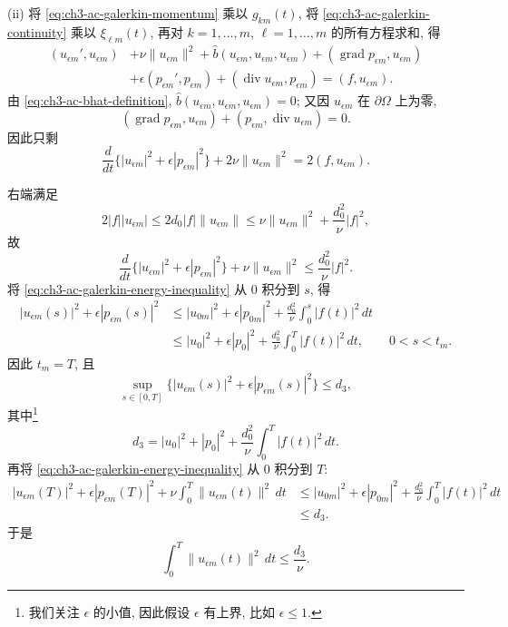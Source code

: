 \begin{Proof}
(ii) 将 \eqref{eq:ch3-ac-galerkin-momentum} 乘以 $g_{km}(t)$, 将 \eqref{eq:ch3-ac-galerkin-continuity} 乘以 $\xi_{\ell m}(t)$, 再对 $k=1,\ldots,m$, $\ell=1,\ldots,m$ 的所有方程求和, 得
\[
\begin{aligned}
(u_{\epsilon m}',u_{\epsilon m})
&+\nu\lVert u_{\epsilon m}\rVert^2
+\widehat b(u_{\epsilon m},u_{\epsilon m},u_{\epsilon m})
+(\operatorname{grad}p_{\epsilon m},u_{\epsilon m})\\
&+\epsilon(p_{\epsilon m}',p_{\epsilon m})
+(\operatorname{div}u_{\epsilon m},p_{\epsilon m})
=(f,u_{\epsilon m}).
\end{aligned}
\]
由 \eqref{eq:ch3-ac-bhat-definition}, $\widehat b(u_{\epsilon m},u_{\epsilon m},u_{\epsilon m})=0$; 又因 $u_{\epsilon m}$ 在 $\partial\Omega$ 上为零,
\[
(\operatorname{grad}p_{\epsilon m},u_{\epsilon m})
+(p_{\epsilon m},\operatorname{div}u_{\epsilon m})=0.
\]
因此只剩
\begin{equation}
\frac d{dt}\{|u_{\epsilon m}|^2+\epsilon|p_{\epsilon m}|^2\}
+2\nu\lVert u_{\epsilon m}\rVert^2
=2(f,u_{\epsilon m}).
\label{eq:ch3-ac-galerkin-energy-identity}
\end{equation}

\hypertarget{chapter-03-page-307}{}
右端满足
\[
2|f||u_{\epsilon m}|
\leq2d_0|f|\lVert u_{\epsilon m}\rVert
\leq\nu\lVert u_{\epsilon m}\rVert^2
+\frac{d_0^2}{\nu}|f|^2,
\]
故
\begin{equation}
\frac d{dt}\{|u_{\epsilon m}|^2+\epsilon|p_{\epsilon m}|^2\}
+\nu\lVert u_{\epsilon m}\rVert^2
\leq\frac{d_0^2}{\nu}|f|^2.
\label{eq:ch3-ac-galerkin-energy-inequality}
\end{equation}
将 \eqref{eq:ch3-ac-galerkin-energy-inequality} 从 $0$ 积分到 $s$, 得
\[
\begin{aligned}
|u_{\epsilon m}(s)|^2+\epsilon|p_{\epsilon m}(s)|^2
&\leq|u_{0m}|^2+\epsilon|p_{0m}|^2
+\frac{d_0^2}{\nu}\int_0^s|f(t)|^2\,dt\\
&\leq|u_0|^2+\epsilon|p_0|^2
+\frac{d_0^2}{\nu}\int_0^T|f(t)|^2\,dt,
\qquad0<s<t_m.
\end{aligned}
\]
因此 $t_m=T$, 且
\begin{equation}
\sup_{s\in[0,T]}
\{|u_{\epsilon m}(s)|^2+\epsilon|p_{\epsilon m}(s)|^2\}
\leq d_3,
\label{eq:ch3-ac-galerkin-linfty-bound}
\end{equation}
其中\footnote{我们关注 $\epsilon$ 的小值, 因此假设 $\epsilon$ 有上界, 比如 $\epsilon\leq1$.}
\begin{equation}
d_3=|u_0|^2+|p_0|^2
+\frac{d_0^2}{\nu}\int_0^T|f(t)|^2\,dt.
\label{eq:ch3-ac-energy-constant}
\end{equation}
再将 \eqref{eq:ch3-ac-galerkin-energy-inequality} 从 $0$ 积分到 $T$:
\[
\begin{aligned}
|u_{\epsilon m}(T)|^2+\epsilon|p_{\epsilon m}(T)|^2
+\nu\int_0^T\lVert u_{\epsilon m}(t)\rVert^2\,dt
&\leq|u_{0m}|^2+\epsilon|p_{0m}|^2
+\frac{d_0^2}{\nu}\int_0^T|f(t)|^2\,dt\\
&\leq d_3.
\end{aligned}
\]
于是
\begin{equation}
\int_0^T\lVert u_{\epsilon m}(t)\rVert^2\,dt
\leq\frac{d_3}{\nu}.
\label{eq:ch3-ac-galerkin-h1-bound}
\end{equation}


\end{Proof}
